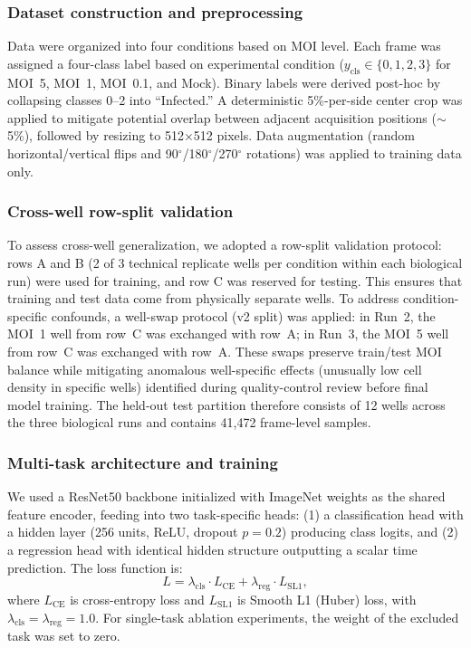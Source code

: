 \documentclass[12pt,letterpaper]{article}
\begin{document}
\subsubsection*{Dataset construction and preprocessing}

Data were organized into four conditions based on MOI level.
Each frame was assigned a four-class label based on experimental condition ($y_{\mathrm{cls}} \in \{0, 1, 2, 3\}$ for MOI~5, MOI~1, MOI~0.1, and Mock).
Binary labels were derived post-hoc by collapsing classes 0--2 into ``Infected.''
A deterministic 5\%-per-side center crop was applied to mitigate potential overlap between adjacent acquisition positions ($\sim$5\%), followed by resizing to 512$\times$512 pixels.
Data augmentation (random horizontal/vertical flips and 90$^{\circ}$/180$^{\circ}$/270$^{\circ}$ rotations) was applied to training data only.

\subsubsection*{Cross-well row-split validation}

To assess cross-well generalization, we adopted a row-split validation protocol: rows A and B (2 of 3 technical replicate wells per condition within each biological run) were used for training, and row C was reserved for testing.
This ensures that training and test data come from physically separate wells.
To address condition-specific confounds, a well-swap protocol (v2 split) was applied: in Run~2, the MOI~1 well from row~C was exchanged with row~A; in Run~3, the MOI~5 well from row~C was exchanged with row~A.
These swaps preserve train/test MOI balance while mitigating anomalous well-specific effects (unusually low cell density in specific wells) identified during quality-control review before final model training.
The held-out test partition therefore consists of 12 wells across the three biological runs and contains 41,472 frame-level samples.

\subsubsection*{Multi-task architecture and training}

We used a ResNet50\cite{ref-he2016resnet} backbone initialized with ImageNet weights as the shared feature encoder, feeding into two task-specific heads:
(1) a classification head with a hidden layer (256 units, ReLU, dropout $p=0.2$) producing class logits, and
(2) a regression head with identical hidden structure outputting a scalar time prediction.
The loss function is:
\[
  L = \lambda_{\mathrm{cls}} \cdot L_{\mathrm{CE}} + \lambda_{\mathrm{reg}} \cdot L_{\mathrm{SL1}},
\]
where $L_{\mathrm{CE}}$ is cross-entropy loss and $L_{\mathrm{SL1}}$ is Smooth L1 (Huber) loss, with $\lambda_{\mathrm{cls}} = \lambda_{\mathrm{reg}} = 1.0$.
For single-task ablation experiments, the weight of the excluded task was set to zero.
\end{document}
